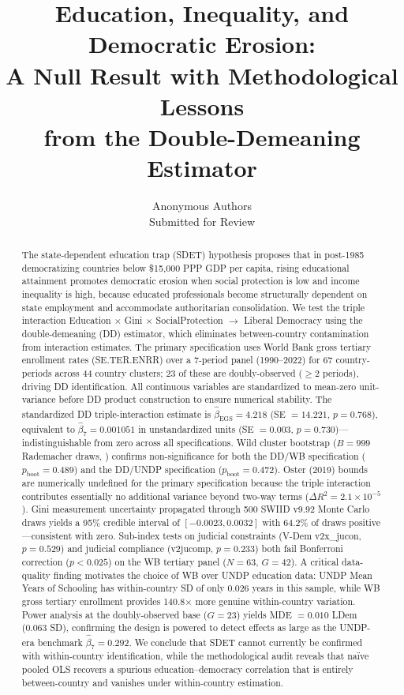 \documentclass[11pt,letterpaper]{article}
\title{\textbf{Education, Inequality, and Democratic Erosion:\\A Null Result with Methodological Lessons\\from the Double-Demeaning Estimator}}
\author{%
  Anonymous Authors\\
  \small Submitted for Review
}
\date{}
\begin{document}
\maketitle

\begin{abstract}
The state-dependent education trap (SDET) hypothesis proposes that in post-1985 democratizing
countries below \$15{,}000 PPP GDP per capita, rising educational attainment promotes democratic
erosion when social protection is low and income inequality is high, because educated professionals
become structurally dependent on state employment and accommodate authoritarian consolidation.
We test the triple interaction Education $\times$ Gini $\times$ SocialProtection $\to$ Liberal
Democracy using the \citet{Giesselmann2022} double-demeaning (DD) estimator, which eliminates
between-country contamination from interaction estimates. The primary specification uses World Bank
gross tertiary enrollment rates (SE.TER.ENRR) over a 7-period panel (1990--2022) for 67
country-periods across 44 country clusters; 23 of these are doubly-observed ($\geq$2 periods),
driving DD identification. All continuous variables are standardized to mean-zero unit-variance
before DD product construction to ensure numerical stability. The standardized DD triple-interaction
estimate is $\hat{\beta}_\text{EGS} = 4.218$ (SE $= 14.221$, $p = 0.768$), equivalent to
$\hat{\beta}_7 = 0.001051$ in unstandardized units (SE $= 0.003$, $p = 0.730$)---indistinguishable
from zero across all specifications. Wild cluster bootstrap ($B = 999$ Rademacher draws,
\citealt{Cameron2008}) confirms non-significance for both the DD/WB specification
($p_\text{boot} = 0.489$) and the DD/UNDP specification ($p_\text{boot} = 0.472$). Oster (2019)
bounds are numerically undefined for the primary specification because the triple interaction
contributes essentially no additional variance beyond two-way terms ($\Delta R^2 = 2.1 \times
10^{-5}$). Gini measurement uncertainty propagated through 500 SWIID v9.92 Monte Carlo draws
yields a 95\% credible interval of $[-0.0023, 0.0032]$ with 64.2\% of draws positive---consistent
with zero. Sub-index tests on judicial constraints (V-Dem v2x\_jucon, $p = 0.529$) and judicial
compliance (v2jucomp, $p = 0.233$) both fail Bonferroni correction ($p < 0.025$) on the WB
tertiary panel ($N = 63$, $G = 42$). A critical data-quality finding motivates the choice of WB
over UNDP education data: UNDP Mean Years of Schooling has within-country SD of only 0.026 years
in this sample, while WB gross tertiary enrollment provides 140.8$\times$ more genuine
within-country variation. Power analysis at the doubly-observed base ($G = 23$) yields
MDE $= 0.010$ LDem (0.063 SD), confirming the design is powered to detect effects as large as the
UNDP-era benchmark $\hat{\beta}_7 = 0.292$. We conclude that SDET cannot currently be confirmed
with within-country identification, while the methodological audit reveals that na\"{i}ve pooled
OLS recovers a spurious education--democracy correlation that is entirely between-country and
vanishes under within-country estimation.
\end{abstract}
\end{document}
